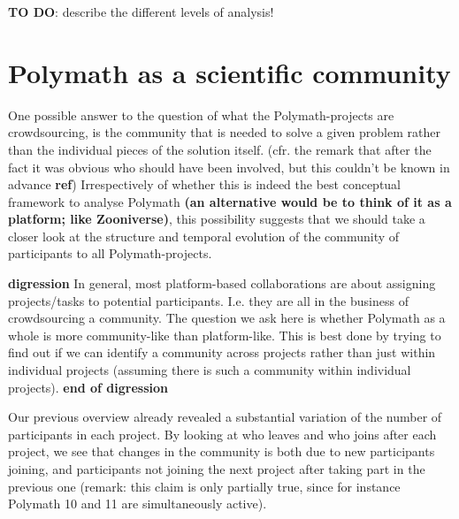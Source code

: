 \documentclass[article, floatfix, groupaddress, prb]{revtex4-1}
\begin{document}
\textbf{TO DO}: describe the different levels of analysis!

    \section{Polymath as a scientific
community}\label{polymath-as-a-scientific-community}

    One possible answer to the question of what the Polymath-projects are
crowdsourcing, is the community that is needed to solve a given problem
rather than the individual pieces of the solution itself. (cfr. the
remark that after the fact it was obvious who should have been involved,
but this couldn't be known in advance \textbf{ref}) Irrespectively of
whether this is indeed the best conceptual framework to analyse Polymath
\textbf{(an alternative would be to think of it as a platform; like
Zooniverse)}, this possibility suggests that we should take a closer
look at the structure and temporal evolution of the community of
participants to all Polymath-projects.

\textbf{digression} In general, most platform-based collaborations are
about assigning projects/tasks to potential participants. I.e. they are
all in the business of crowdsourcing a community. The question we ask
here is whether Polymath as a whole is more community-like than
platform-like. This is best done by trying to find out if we can
identify a community across projects rather than just within individual
projects (assuming there is such a community within individual
projects). \textbf{end of digression}

Our previous overview already revealed a substantial variation of the
number of participants in each project. By looking at who leaves and who
joins after each project, we see that changes in the community is both
due to new participants joining, and participants not joining the next
project after taking part in the previous one (remark: this claim is
only partially true, since for instance Polymath 10 and 11 are
simultaneously active).


    \begin{figure}
        \begin{center}\end{center}
        \caption{}
        \label{}
    \end{figure}
    
    \begin{figure}
        \begin{center}\end{center}
        \caption{}
        \label{}
    \end{figure}
    
\end{document}

